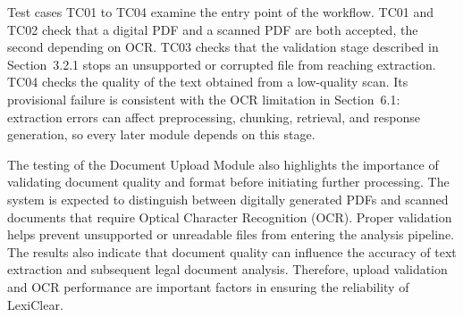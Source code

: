 \documentclass[12pt,a4paper,oneside]{report}
\begin{document}
Test cases TC01 to TC04 examine the entry point of the workflow. TC01 and TC02 check that a digital PDF and a scanned PDF are both accepted, the second depending on OCR. TC03 checks that the validation stage described in Section~3.2.1 stops an unsupported or corrupted file from reaching extraction. TC04 checks the quality of the text obtained from a low-quality scan. Its provisional failure is consistent with the OCR limitation in Section~6.1: extraction errors can affect preprocessing, chunking, retrieval, and response generation, so every later module depends on this stage.

The testing of the Document Upload Module also highlights the importance of validating document quality and format before initiating further processing. The system is expected to distinguish between digitally generated PDFs and scanned documents that require Optical Character Recognition (OCR). Proper validation helps prevent unsupported or unreadable files from entering the analysis pipeline. The results also indicate that document quality can influence the accuracy of text extraction and subsequent legal document analysis. Therefore, upload validation and OCR performance are important factors in ensuring the reliability of LexiClear.
\end{document}
